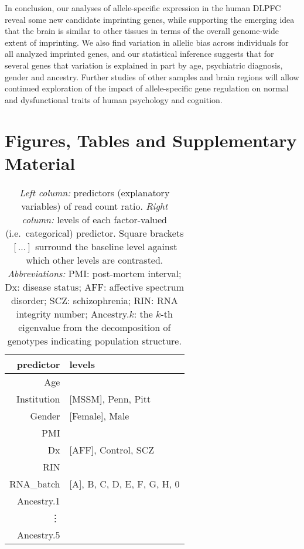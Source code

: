 \documentclass[letterpaper]{article}
\begin{document}
In conclusion, our analyses of allele-specific expression in the human DLPFC
reveal some new candidate imprinting genes, while supporting the emerging idea
that the brain is similar to other tissues in terms of the overall genome-wide
extent of imprinting.  We also find variation in allelic bias
across individuals for all analyzed imprinted genes, and our statistical
inference suggests that for several genes that variation is explained in part
by age, psychiatric diagnosis, gender and ancestry. Further studies
of other samples and brain regions will allow continued exploration of the
impact of allele-specific gene regulation on normal and dysfunctional traits
of human psychology and cognition.




\newpage

\section{Figures, Tables and Supplementary Material}

\begin{table}[h]
\begin{center}
\begin{tabular}{r|l}
predictor & levels\\
\hline
Age &  \\
Institution & [MSSM], Penn, Pitt\\
Gender & [Female], Male\\
PMI & \\
Dx & [AFF], Control, SCZ\\
RIN &  \\
RNA\_batch & [A], B, C, D, E, F, G, H, 0\\
Ancestry.1 & \\
\vdots & \\
Ancestry.5 &  \\
\end{tabular}
\caption{ \emph{Left column:} predictors (explanatory variables) of read count
ratio.  \emph{Right column:} levels of each factor-valued (i.e.~categorical)
predictor.  Square brackets \([...]\) surround the baseline level against
which other levels are contrasted.  \emph{Abbreviations:} PMI: post-mortem
interval; Dx: disease status; AFF: affective spectrum disorder; SCZ:
schizophrenia; RIN: RNA integrity number;
Ancestry.\(k\): the \(k\)-th eigenvalue from the decomposition of genotypes
indicating population structure.}
\label{tab:predictors}
\end{center}
\end{table}
\end{document}
